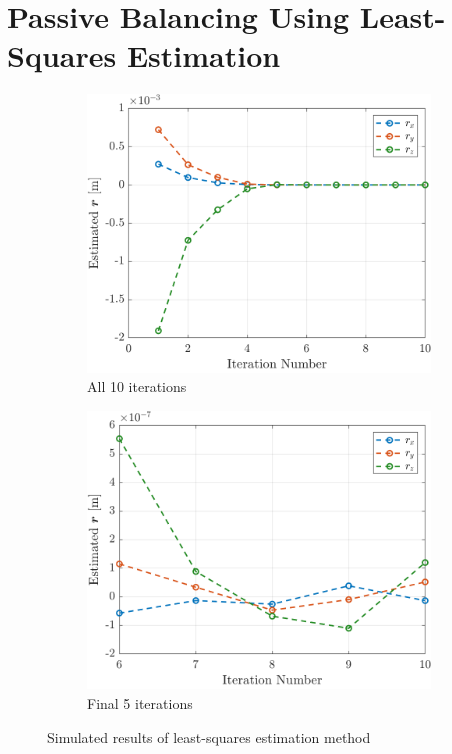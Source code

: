 \section{Passive Balancing Using Least-Squares Estimation}

\begin{figure}[ht]
  \centering
  \begin{subfigure}[t]{0.47\textwidth}
    \includegraphics[width=\linewidth]{plots/LSR_sim_all_runs.png}
    \caption{All 10 iterations}\label{fig:a}
  \end{subfigure}\hfill
  \begin{subfigure}[t]{0.47\textwidth}
    \includegraphics[width=\linewidth]{plots/LSR_sim_last_5_runs.png}
    \caption{Final 5 iterations}\label{fig:b}
  \end{subfigure}
  \caption{Simulated results of least-squares estimation method}
  \label{fig:twopanels}
\end{figure}

